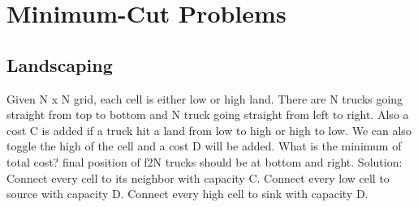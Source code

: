 \section{Minimum-Cut Problems}
\subsection{Landscaping}
Given N x N grid, each cell is either low or high land. There are N trucks going straight from top to bottom and N truck going straight from left to right.
Also a cost C is added if a truck hit a land from low to high or high to low. 
We can also toggle the high of the cell and a cost D will be added. 
What is the minimum of total cost? final position of f2N trucks should be at bottom and right. Solution: Connect every cell to its neighbor with capacity C. Connect every low cell to source with capacity D. Connect every high cell to sink with capacity D.



